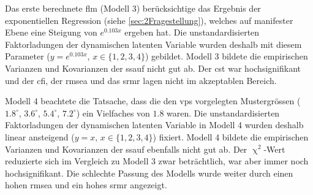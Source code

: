\documentclass[11pt, twoside, a4paper]{book}		%
\begin{document}
Das erste berechnete \gls{flm} (Modell 3) berücksichtige das Ergebnis der exponentiellen Regression (siehe \autoref{sec:2Fragestellung}), welches auf manifester Ebene eine Steigung von $e^{0.103x}$ ergeben hat. Die unstandardisierten Faktorladungen der dynamischen latenten Variable wurden deshalb mit diesem Parameter ($y=e^{0.103x},\,x\in\{1, 2, 3, 4\}$) gebildet. Modell 3 bildete die empirischen Varianzen und Kovarianzen der \gls{ssauf} nicht gut ab. Der \gls{cst} war hochsignifikant und der \gls{cfi}, der \gls{rmsea} und das \gls{srmr} lagen nicht im akzeptablen Bereich.

Modell 4 beachtete die Tatsache, dass die den \glspl{vp} vorgelegten Mustergrössen ($1.8^{\circ}$, $3.6^{\circ}$, $5.4^{\circ}$, $7.2^{\circ}$) ein Vielfaches von $1.8$ waren.
Die unstandardisierten Faktorladungen der dynamischen latenten Variable in Modell 4 wurden deshalb linear ansteigend ($y=x,\,x\in\{1, 2, 3, 4\}$) fixiert. Modell 4 bildete die empirischen Varianzen und Kovarianzen der \gls{ssauf} ebenfalls nicht gut ab. Der $\upchi^2$-Wert reduzierte sich im Vergleich zu Modell 3 zwar beträchtlich, war aber immer noch hochsignifikant. Die schlechte Passung des Modells wurde weiter durch einen hohen \gls{rmsea} und ein hohes \gls{srmr} angezeigt.
\end{document}

